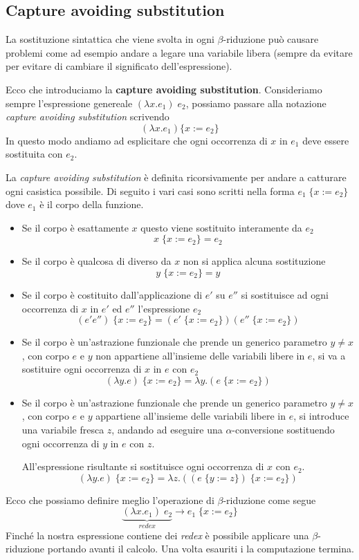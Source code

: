 \subsection{Capture avoiding substitution}
La sostituzione sintattica che viene svolta in ogni $\beta$-riduzione può causare problemi come ad esempio andare a
legare una variabile libera (sempre da evitare per evitare di cambiare il significato dell'espressione).

Ecco che introduciamo la \textbf{capture avoiding substitution}. Consideriamo sempre l'espressione genereale
$(\lambda x.e_1) \; e_2$, possiamo passare alla notazione \emph{capture avoiding substitution} scrivendo
\[ (\lambda x.e_1) \{ x := e_2 \} \]
In questo modo andiamo ad esplicitare che ogni occorrenza di $x$ in $e_1$ deve essere sostituita con $e_2$.

La \emph{capture avoiding substitution} è definita ricorsivamente per andare a catturare ogni casistica possibile. Di
seguito i vari casi sono scritti nella forma $e_1 \; \{ x := e_2 \}$ dove $e_1$ è il corpo della funzione.
\begin{itemize}
	\item Se il corpo è esattamente $x$ questo viene sostituito interamente da $e_2$
	      \[ x \; \{ x := e_2 \} = e_2 \]
	\item Se il corpo è qualcosa di diverso da $x$ non si applica alcuna sostituzione
	      \[ y \; \{ x := e_2 \} = y \]
	\item Se il corpo è costituito dall'applicazione di $e'$ su $e''$ si sostituisce ad ogni occorrenza di $x$ in
	      $e'$ ed $e''$ l'espressione $e_2$
	      \[ (e' e'') \; \{ x := e_2 \} = (e' \; \{ x := e_2 \})(e'' \; \{ x := e_2 \}) \]
	\item Se il corpo è un'astrazione funzionale che prende un generico parametro $y \neq x$, con corpo $e$ e $y$ non
	      appartiene all'insieme delle variabili libere in $e$, si va a sostituire ogni occorrenza di $x$ in $e$ con
	      $e_2$
	      \[ (\lambda y.e) \; \{ x := e_2 \} = \lambda y.(e \; \{ x := e_2 \}) \]
	\item Se il corpo è un'astrazione funzionale che prende un generico parametro $y \neq x$, con corpo $e$ e $y$
	      appartiene all'insieme delle variabili libere in $e$, si introduce una variabile fresca $z$, andando ad
	      eseguire una $\alpha$-conversione sostituendo ogni occorrenza di $y$ in $e$ con $z$.

	      All'espressione risultante si sostituisce ogni occorrenza di $x$ con $e_2$.
	      \[ (\lambda y.e) \; \{ x := e_2 \} = \lambda z.((e \; \{ y := z \}) \; \{ x := e_2 \}) \]
\end{itemize}
Ecco che possiamo definire meglio l'operazione di $\beta$-riduzione come segue
\[ \underbrace{(\lambda x.e_1) \; e_2}_{redex} \rightarrow e_1 \; \{ x := e_2 \} \]
Finché la nostra espressione contiene dei \emph{redex} è possibile applicare una $\beta$-riduzione portando avanti
il calcolo. Una volta esauriti i la computazione termina.

